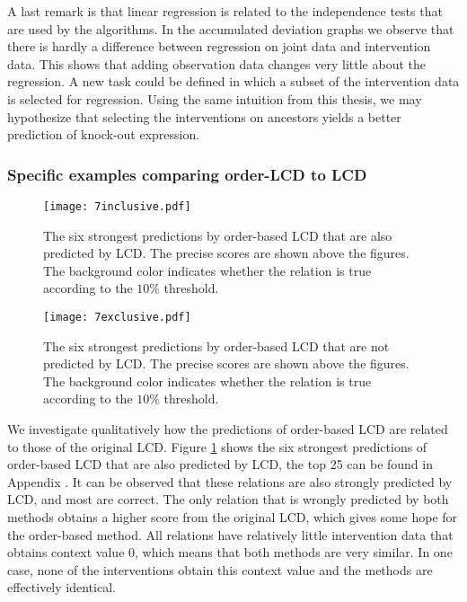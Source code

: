 A last remark is that linear regression is related to the independence tests that are used by the algorithms. In the accumulated deviation graphs we observe that there is hardly a difference between regression on joint data and intervention data. This shows that adding observation data changes very little about the regression. A new task could be defined in which a subset of the intervention data is selected for regression. Using the same intuition from this thesis, we may hypothesize that selecting the interventions on ancestors yields a better prediction of knock-out expression.




\subsubsection{Specific examples comparing order-LCD to LCD}


\begin{figure}[p]
    \centering
    \texttt{[image: 7inclusive.pdf]}
    \caption{The six strongest predictions by order-based LCD that are also predicted by LCD. The precise scores are shown above the figures. The background color indicates whether the relation is true according to the $10\%$ threshold.}
    \label{fig:7:exincl}
\end{figure}

\begin{figure}[p]
    \centering
    \texttt{[image: 7exclusive.pdf]}
    \caption{The six strongest predictions by order-based LCD that are not predicted by LCD. The precise scores are shown above the figures. The background color indicates whether the relation is true according to the $10\%$ threshold.}
    \label{fig:7:exexcl}
\end{figure}

We investigate qualitatively how the predictions of order-based LCD are related to those of the original LCD. Figure \ref{fig:7:exincl} shows the six strongest predictions of order-based LCD that are also predicted by LCD, the top 25 can be found in Appendix . It can be observed that these relations are also strongly predicted by LCD, and most are correct. The only relation that is wrongly predicted by both methods obtains a higher score from the original LCD, which gives some hope for the order-based method. All relations have relatively little intervention data that obtains context value $0$, which means that both methods are very similar. In one case, none of the interventions obtain this context value and the methods are effectively identical. 

